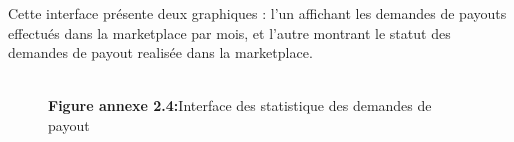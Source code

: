 Cette interface présente deux graphiques : l’un affichant les demandes de payouts effectués dans la marketplace par mois, et l’autre montrant le statut des demandes de payout realisée dans la marketplace. 
\begin{figure}[H]
    \centering
    {\\\textbf{Figure annexe 2.4:}Interface des statistique des demandes de payout }
    \label{fig:logo_tt}
\end{figure}
\pagebreak



